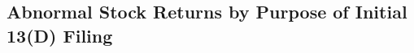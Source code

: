 \documentclass[12pt]{article}
\begin{document}
\pagebreak

\subsection{Abnormal Stock Returns by Purpose of Initial 13(D) Filing}


  

\end{document}
